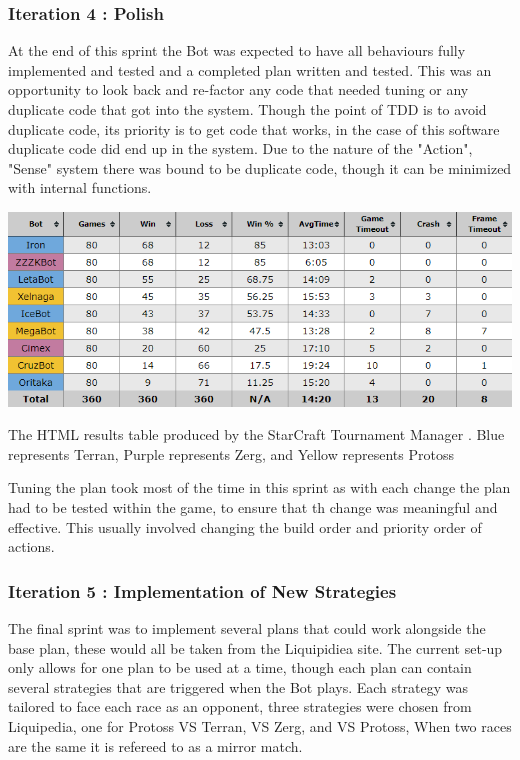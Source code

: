 \documentclass[journal]{IEEEtran}
\begin{document}
\subsubsection{Iteration 4 : Polish}
At the end of this sprint the Bot was expected to have all behaviours fully implemented and tested and a completed plan written and tested. This was an opportunity to look back and re-factor any code that needed tuning or any duplicate code that got into the system. Though the point of TDD is to avoid duplicate code, its priority is to get code that works, in the case of this software duplicate code did end up in the system. Due to the nature of the "Action", "Sense" system there was bound to be duplicate code, though it can be minimized with internal functions.
\begin{table}[]
	\centering
	\includegraphics[width=\textwidth]{STMResults}
	\caption{The HTML results table produced by the StarCraft Tournament Manager \cite{Tournament}. Blue represents Terran, Purple represents Zerg, and Yellow represents Protoss}
	\label{Table1}
\end{table}
Tuning the plan took most of the time in this sprint as with each change the plan had to be tested within the game, to ensure that th change was meaningful and effective. This usually involved changing the build order and priority order of actions.
\newline

\subsubsection{Iteration 5 : Implementation of New Strategies}
The final sprint was to implement several plans that could work alongside the base plan, these would all be taken from the Liquipidiea site. The current set-up only allows for one plan to be used at a time, though each plan can contain several strategies that are triggered when the Bot plays. Each strategy was tailored to face each race as an opponent, three strategies were chosen from Liquipedia, one for Protoss VS Terran, VS Zerg, and VS Protoss, When two races are the same it is refereed to as a mirror match.
\end{document}
